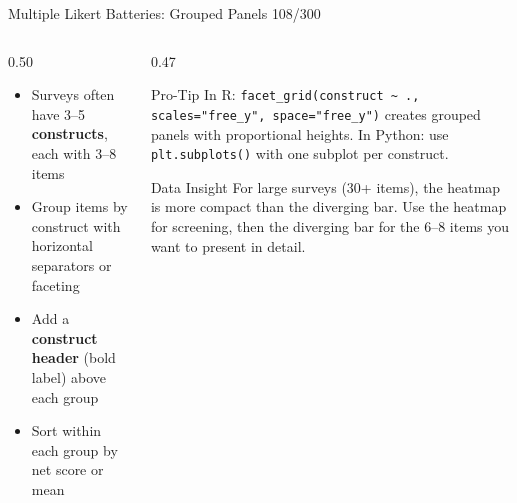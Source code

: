 \documentclass[10pt]{beamer}
\newcommand{\smark}[1]{\hfill{\scriptsize\color{codegray}#1}}
\begin{document}
\begin{frame}{Multiple Likert Batteries: Grouped Panels}
\smark{108/300}
\begin{columns}[T]
\begin{column}{0.50\textwidth}
\begin{itemize}
    \item Surveys often have 3--5 \textbf{constructs}, each with 3--8 items
    \item Group items by construct with horizontal separators or faceting
    \item Add a \textbf{construct header} (bold label) above each group
    \item Sort within each group by net score or mean
\end{itemize}
\end{column}
\begin{column}{0.47\textwidth}
\begin{alertblock}{Pro-Tip}
    \scriptsize In R: \texttt{facet\_grid(construct \textasciitilde\ ., scales="free\_y", space="free\_y")} creates grouped panels with proportional heights. In Python: use \texttt{plt.subplots()} with one subplot per construct.
\end{alertblock}
\vspace{0.1cm}
\begin{exampleblock}{Data Insight}
    \scriptsize For large surveys (30+ items), the heatmap is more compact than the diverging bar. Use the heatmap for screening, then the diverging bar for the 6--8 items you want to present in detail.
\end{exampleblock}
\end{column}
\end{columns}
\end{frame}
\end{document}
